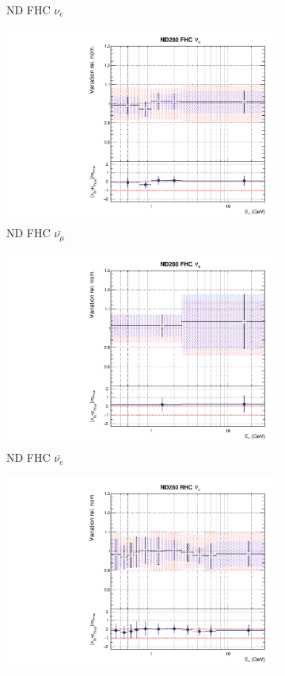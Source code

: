 \begin{figure}[t]
\begin{subfigure}{0.24\textwidth}
  \caption{ND FHC $\nu_e$}
\end{subfigure}
\begin{subfigure}{0.24\textwidth}
  \centering
  \includegraphics[width=0.95\linewidth]{figs/rhcmpdat248flux_2}
  \caption{ND FHC $\bar{\nu_{\mu}}$}
\end{subfigure}
\begin{subfigure}{0.24\textwidth}
  \centering
  \includegraphics[width=0.95\linewidth]{figs/rhcmpdat248flux_3}
  \caption{ND FHC $\bar{\nu_{e}}$}
\end{subfigure}
\begin{subfigure}{0.24\textwidth}
  \centering
  \includegraphics[width=0.95\linewidth]{figs/rhcmpdat248flux_4}

\end{subfigure}
\end{figure}
